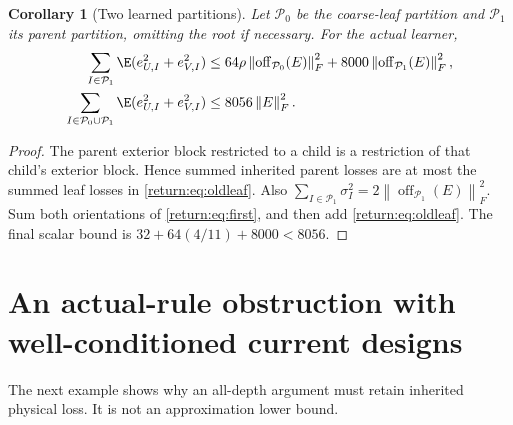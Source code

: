 \documentclass[11pt,oneside,openany,a4paper]{book}
\numberwithin{equation}{chapter}
\newtheorem{corollary}[theorem]{Corollary}
\theoremstyle{definition}
\theoremstyle{remark}
\newcommand{\F}[1]{\left\lVert#1\right\rVert_F}
\begin{document}
\begin{corollary}[Two learned partitions]\label{return:cor:two}
Let $\mathcal P_0$ be the coarse-leaf partition and $\mathcal P_1$ its parent partition, omitting the root if necessary. For the actual learner,
\begin{align}
 \sum_{I\in\mathcal P_1}\E(e_{U,I}^2+e_{V,I}^2)
 &\le64\rho\F{\operatorname{off}_{\mathcal P_0}(E)}^2
      +8000\F{\operatorname{off}_{\mathcal P_1}(E)}^2,\label{return:eq:secondsum}\\
 \sum_{I\in\mathcal P_0\cup\mathcal P_1}\E(e_{U,I}^2+e_{V,I}^2)
 &\le8056\F E^2.\label{return:eq:twosum}
\end{align}
\end{corollary}
\begin{proof}
The parent exterior block restricted to a child is a restriction of that child's exterior block. Hence summed inherited parent losses are at most the summed leaf losses in \eqref{return:eq:oldleaf}. Also
$\sum_{I\in\mathcal P_1}\sigma_I^2=2\F{\operatorname{off}_{\mathcal P_1}(E)}^2$.
Sum both orientations of \eqref{return:eq:first}, and then add \eqref{return:eq:oldleaf}. The final scalar bound is
$32+64(4/11)+8000<8056$.
\end{proof}

\section{An actual-rule obstruction with well-conditioned current designs}
The next example shows why an all-depth argument must retain inherited physical loss. It is not an approximation lower bound.
\end{document}

